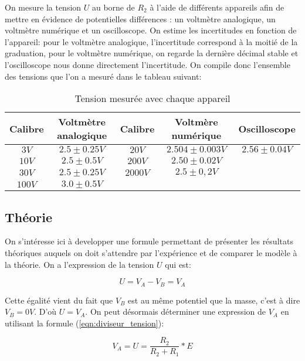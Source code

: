 \documentclass[10pt]{article}
\begin{document}
On mesure la tension $U$ au borne de $R_{2}$ à l'aide de différents appareils afin de mettre en évidence de potentielles différences
: un voltmètre analogique, un voltmètre numérique et un oscilloscope. On estime les incertitudes en fonction de l'appareil: pour le voltmètre analogique, l'incertitude correspond à la moitié de la graduation, pour le voltmètre numérique, on regarde la dernière décimal stable et l'oscilloscope nous donne directement l'incertitude. On compile donc l'ensemble des tensions que l'on a mesuré dans
le tableau suivant:

\begin{table}[h!]
    \begin{center}
        \begin{tabular}{|c|c||c|c||c|}
            \hline
            Calibre & Voltmètre analogique & Calibre & Voltmère numérique & Oscilloscope \\
            \hline
            $3V$ & $2.5 \pm 0.25V$ & $20V$ & $2.504 \pm 0.003V$ & $2.56 \pm 0.04V$ \\
            $10V$ & $2.5 \pm 0.5V$ & $200V$ & $2.50 \pm 0.02V$ &  \\
            $30V$ & $2.5 \pm 0.25V$ & $2000V$ & $2.5 \pm 0,2V$ &  \\
            $100V$ & $3.0 \pm 0.5V$ & & & \\
            \hline
        \end{tabular}
        \caption{Tension mesurée avec chaque appareil}
        \label{table:table1}
    \end{center}
\end{table}

\subsection{Théorie}
On s'intéresse ici à developper une formule permettant de présenter les résultats théoriques auquels on doit s'attendre par l'expérience
et de comparer le modèle à la théorie. On a l'expression de la tension $U$ qui est:

\begin{equation}
    U = V_A - V_B = V_A
\end{equation}

Cette égalité vient du fait que $V_B$ est au même potentiel que la masse, c'est à dire $V_B = 0V$. D'où $U = V_A$. On peut
désormais déterminer une expression de $V_A$ en utilisant la formule (\ref{eqn:diviseur_tension}):

\begin{equation}
    V_A = U = \frac{R_2}{R_2 + R_1} * E
\end{equation}
\end{document}
